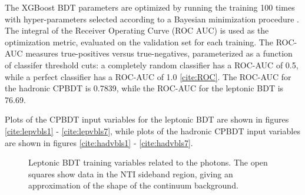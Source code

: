 The XGBoost BDT parameters are optimized by running the training 100 times with hyper-parameters selected according to a Bayesian minimization procedure \cite{skopt}. The integral of the Receiver Operating Curve (ROC AUC) is used as the optimization metric, evaluated on the validation set for each training. The ROC-AUC measures true-positives versus true-negatives, parameterized as a function of classifer threshold cuts: a completely random classifier has a ROC-AUC of 0.5, while a perfect classifier has a ROC-AUC of 1.0 \ref{cite:ROC}. The ROC-AUC for the hadronic CPBDT is 0.7839, while the ROC-AUC for the leptonic BDT is 76.69.

Plots of the CPBDT input variables for the leptonic BDT are shown in figures \ref{cite:lepvbls1} -  \ref{cite:lepvbls7}, while plots of the hadronic CPBDT input variables are shown in figures \ref{cite:hadvbls1} -  \ref{cite:hadvbls7}.

\begin{figure}[htbp]
  \centering
  \caption{Leptonic BDT training variables related to the photons. The open squares show data in the NTI sideband region, giving an approximation of the shape of the continuum background. }
  \label{fig:lepvbls1}
\end{figure}

